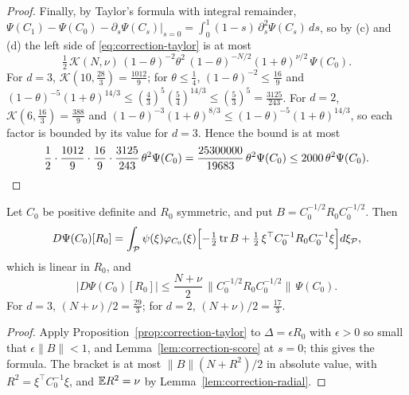 \begin{proof}
Finally, by Taylor's formula with integral remainder, $\Psi(C_1)-\Psi(C_0)-\partial_s\Psi(C_s)|_{s=0}=\int_0^1(1-s)\,\partial_s^2\Psi(C_s)\,ds$, so by (c) and (d) the left side of \eqref{eq:correction-taylor} is at most
\[
\tfrac12\,\mathcal K(N,\nu)\,(1-\theta)^{-2}\theta^2\,(1-\theta)^{-N/2}(1+\theta)^{\nu/2}\,\Psi(C_0).
\]
For $d=3$, $\mathcal K(10,\frac{28}3)=\frac{1012}9$; for $\theta\le\frac14$, $(1-\theta)^{-2}\le\frac{16}9$ and $(1-\theta)^{-5}(1+\theta)^{14/3}\le(\frac43)^5(\frac54)^{14/3}\le(\frac53)^5=\frac{3125}{243}$. For $d=2$, $\mathcal K(6,\frac{16}3)=\frac{388}9$ and $(1-\theta)^{-3}(1+\theta)^{8/3}\le(1-\theta)^{-5}(1+\theta)^{14/3}$, so each factor is bounded by its value for $d=3$. Hence the bound is at most
\[
\frac12\cdot\frac{1012}9\cdot\frac{16}9\cdot\frac{3125}{243}\,\theta^2\Psi(C_0)=\frac{25300000}{19683}\,\theta^2\Psi(C_0)\le2000\,\theta^2\Psi(C_0).\qedhere
\]
\end{proof}

\begin{lemma}\label{lem:correction-first}
Let $C_0$ be positive definite and $R_0$ symmetric, and put $B=C_0^{-1/2}R_0C_0^{-1/2}$. Then
\[
D\Psi(C_0)[R_0]=\int_{\mathcal P}\psi(\xi)\varphi_{C_0}(\xi)\Bigl[-\tfrac12\operatorname{tr} B+\tfrac12\,\xi^{\top}C_0^{-1}R_0C_0^{-1}\xi\Bigr]d\xi_{\mathcal P},
\]
which is linear in $R_0$, and
\begin{equation}\label{eq:correction-first}
\bigl|D\Psi(C_0)[R_0]\bigr|\le\frac{N+\nu}2\,\bigl\|C_0^{-1/2}R_0C_0^{-1/2}\bigr\|\,\Psi(C_0).
\end{equation}
For $d=3$, $(N+\nu)/2=\frac{29}3$; for $d=2$, $(N+\nu)/2=\frac{17}3$.
\end{lemma}

\begin{proof}
Apply Proposition~\ref{prop:correction-taylor} to $\Delta=\epsilon R_0$ with $\epsilon>0$ so small that $\epsilon\|B\|<1$, and Lemma~\ref{lem:correction-score} at $s=0$; this gives the formula. The bracket is at most $\|B\|(N+R^2)/2$ in absolute value, with $R^2=\xi^{\top}C_0^{-1}\xi$, and $\mathbb E R^2=\nu$ by Lemma~\ref{lem:correction-radial}.
\end{proof}

